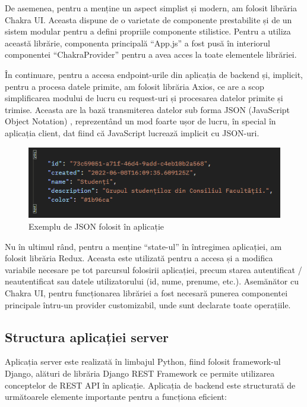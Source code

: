 De asemenea, pentru a menține un aspect simplist și modern, am folosit librăria Chakra UI. Aceasta dispune de o varietate de componente prestabilite și de un sistem modular pentru a defini propriile componente stilistice. Pentru a utiliza această librărie, componenta principală \enquote{App.js} a fost pusă în interiorul componentei \enquote{ChakraProvider} pentru a avea acces la toate elementele librăriei.

În continuare, pentru a accesa endpoint-urile din aplicația de backend și, implicit, pentru a procesa datele primite, am folosit librăria Axios, ce are a scop simplificarea modului de lucru cu request-uri și procesarea datelor primite și trimise. Aceasta are la bază transmiterea datelor sub forma JSON (JavaScript Object Notation) \cite{JSON_what_is}, reprezentând un mod foarte ușor de lucru, în special în aplicația client, dat fiind că JavaScript lucrează implicit cu JSON-uri.

\begin{figure}[!h]
    \centering
    \includegraphics[width=115mm]{images/json_example.png}
    \caption{Exemplu de JSON folosit în aplicație}
\end{figure}

Nu în ultimul rând, pentru a menține \enquote{state-ul} în întregimea aplicației, am folosit librăria Redux. Aceasta este utilizată pentru a accesa și a modifica variabile necesare pe tot parcursul folosirii aplicației, precum starea autentificat / neautentificat sau datele utilizatorului (id, nume, prenume, etc.). Asemănător cu Chakra UI, pentru funcționarea librăriei a fost necesară punerea componentei principale întru-un provider customizabil, unde sunt declarate toate operațiile. 

\subsection{Structura aplicației server}

Aplicația server este realizată în limbajul Python, fiind folosit framework-ul Django, alături de librăria Django REST Framework ce permite utilizarea conceptelor de REST API în aplicație. Aplicația de backend este structurată de următoarele elemente importante pentru a funcționa eficient:

